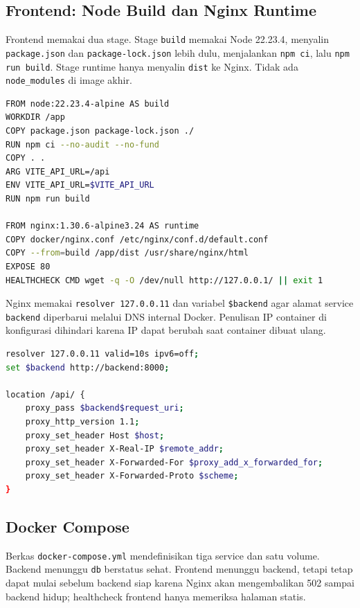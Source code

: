 \documentclass[12pt,a4paper,oneside]{book}
\begin{document}
\subsection{Frontend: Node Build dan Nginx Runtime}

Frontend memakai dua stage. Stage \texttt{build} memakai Node 22.23.4, menyalin
\texttt{package.json} dan \texttt{package-lock.json} lebih dulu, menjalankan
\texttt{npm ci}, lalu \texttt{npm run build}. Stage runtime hanya menyalin
\texttt{dist} ke Nginx. Tidak ada \texttt{node\_modules} di image akhir.

\begin{lstlisting}[language=bash,caption={Dockerfile frontend dua tahap},label={kode:frontenddocker}]
FROM node:22.23.4-alpine AS build
WORKDIR /app
COPY package.json package-lock.json ./
RUN npm ci --no-audit --no-fund
COPY . .
ARG VITE_API_URL=/api
ENV VITE_API_URL=$VITE_API_URL
RUN npm run build

FROM nginx:1.30.6-alpine3.24 AS runtime
COPY docker/nginx.conf /etc/nginx/conf.d/default.conf
COPY --from=build /app/dist /usr/share/nginx/html
EXPOSE 80
HEALTHCHECK CMD wget -q -O /dev/null http://127.0.0.1/ || exit 1
\end{lstlisting}

Nginx memakai \texttt{resolver 127.0.0.11} dan variabel \texttt{\$backend} agar
alamat service \texttt{backend} diperbarui melalui DNS internal Docker. Penulisan
IP container di konfigurasi dihindari karena IP dapat berubah saat container
dibuat ulang.

\begin{lstlisting}[language=bash,caption={Proxy \texttt{/api/} pada Nginx},label={kode:nginx}]
resolver 127.0.0.11 valid=10s ipv6=off;
set $backend http://backend:8000;

location /api/ {
    proxy_pass $backend$request_uri;
    proxy_http_version 1.1;
    proxy_set_header Host $host;
    proxy_set_header X-Real-IP $remote_addr;
    proxy_set_header X-Forwarded-For $proxy_add_x_forwarded_for;
    proxy_set_header X-Forwarded-Proto $scheme;
}
\end{lstlisting}

\subsection{Docker Compose}

Berkas \texttt{docker-compose.yml} mendefinisikan tiga service dan satu volume.
Backend menunggu \texttt{db} berstatus sehat. Frontend menunggu backend, tetapi
tetap dapat mulai sebelum backend siap karena Nginx akan mengembalikan 502 sampai
backend hidup; healthcheck frontend hanya memeriksa halaman statis.
\end{document}
